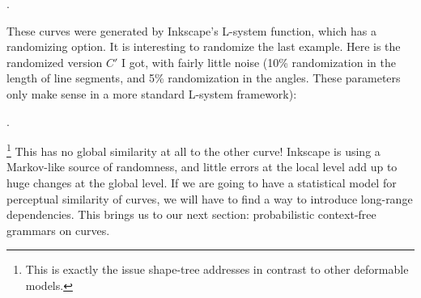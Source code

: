 .

These curves were generated by Inkscape's L-system function, which has
a randomizing option. It is interesting to randomize the last
example. Here is the randomized version $C'$ I got, with fairly little
noise (10\% randomization in the length of line segments, and 5\%
randomization in the angles. These parameters only make sense in a
more standard L-system framework):

.


\footnote{This is exactly the issue shape-tree addresses in contrast
  to other deformable models.}  This has no global similarity at all
to the other curve! Inkscape is using a Markov-like source of
randomness, and little errors at the local level add up to huge
changes at the global level. If we are going to have a statistical
model for perceptual similarity of curves, we will have to find a way
to introduce long-range dependencies. This brings us to our next
section: probabilistic context-free grammars on curves.

